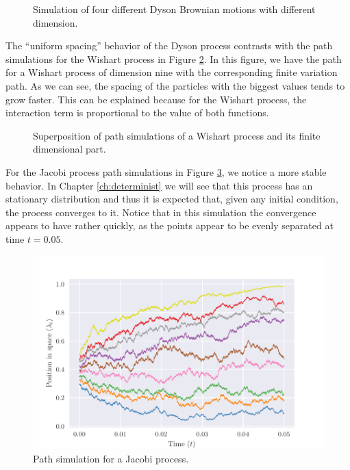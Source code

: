 \begin{figure}[h!] 
    
    \caption{Simulation of four different Dyson Brownian motions with different dimension.\label{fig:four_dyson}}
\end{figure}

The ``uniform spacing'' behavior of the Dyson process contrasts with the path simulations for the Wishart process in Figure \ref{fig:wishart_comparison}. In this figure, we have the path for a Wishart process of dimension nine with the corresponding finite variation path. As we can see, the spacing of the particles with the biggest values tends to grow faster. This can be explained because for the Wishart process, the interaction term is proportional to the value of both functions.

\begin{figure} 
    
    \caption{Superposition of path simulations of a Wishart process and its finite dimensional part.\label{fig:wishart_comparison}}
\end{figure}

For the Jacobi process path simulations in Figure \ref{fig:jacobi}, we notice a more stable behavior. In Chapter \ref{ch:determinist} we will see that this process has an stationary distribution and thus it is expected that, given any initial condition, the process converges to it. Notice that in this simulation the convergence appears to have rather quickly, as the points appear to be evenly separated at time $t=0.05$.

\begin{figure} 
    \includegraphics[width=6in]{img/jacobi.pdf}
    \caption{Path simulation for a Jacobi process.\label{fig:jacobi}}
\end{figure}